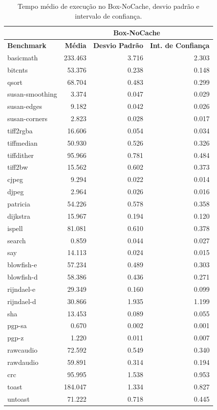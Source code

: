 \documentclass[11pt,twoside]{article}
\begin{document}
\begin{table}
 \caption{Tempo médio de execução no Box-NoCache, desvio padrão e intervalo de confiança.}
 \begin{center}
 \begin{tabular}{|l|r|r|r|}
   \cline{2-4}
   \multicolumn{1}{c|}{}& \multicolumn{3}{|c|}{Box-NoCache} \\ \hline
   \bf{Benchmark} & \bf{Média} & \bf{Desvio Padrão} & \bf{Int. de Confiança} \\ \hline
   basicmath & 233.463 & 3.716 & 2.303\\ \hline 
   bitcnts & 53.376 & 0.238 & 0.148\\ \hline 
   qsort & 68.704 & 0.483 & 0.299\\ \hline 
   susan-smoothing & 3.374 & 0.047 & 0.029\\ \hline 
   susan-edges & 9.182 & 0.042 & 0.026\\ \hline 
   susan-corners & 2.823 & 0.028 & 0.017\\ \hline 
   tiff2rgba & 16.606 & 0.054 & 0.034\\ \hline 
   tiffmedian & 50.930 & 0.526 & 0.326\\ \hline 
   tiffdither & 95.966 & 0.781 & 0.484\\ \hline 
   tiff2bw & 15.562 & 0.602 & 0.373\\ \hline 
   cjpeg & 9.294 & 0.022 & 0.014\\ \hline 
   djpeg & 2.964 & 0.026 & 0.016\\ \hline 
   patricia & 54.226 & 0.578 & 0.358\\ \hline 
   dijkstra & 15.967 & 0.194 & 0.120\\ \hline 
   ispell & 81.081 & 0.610 & 0.378\\ \hline 
   search & 0.859 & 0.044 & 0.027\\ \hline 
   say & 14.113 & 0.024 & 0.015\\ \hline 
   blowfish-e & 57.234 & 0.489 & 0.303\\ \hline 
   blowfish-d & 58.386 & 0.436 & 0.271\\ \hline 
   rijndael-e & 29.349 & 0.160 & 0.099\\ \hline 
   rijndael-d & 30.866 & 1.935 & 1.199\\ \hline 
   sha & 13.453 & 0.089 & 0.055\\ \hline 
   pgp-sa & 0.670 & 0.002 & 0.001\\ \hline 
   pgp-z & 1.220 & 0.011 & 0.007\\ \hline 
   rawcaudio & 72.592 & 0.549 & 0.340\\ \hline 
   rawdaudio & 59.891 & 0.314 & 0.194\\ \hline 
   crc & 95.995 & 1.538 & 0.953\\ \hline 
   toast & 184.047 & 1.334 & 0.827\\ \hline 
   untoast & 71.222 & 0.718 & 0.445\\
   \hline
  \end{tabular}
  \label{tab:tempos_boxnocache}
 \end{center}
\end{table}
 
\end{document}
